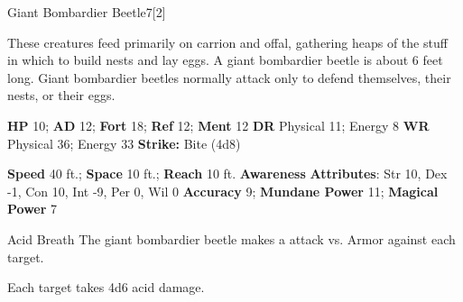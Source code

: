   \begin{monsection}{Giant Bombardier Beetle}{7}[2]
    \vspace{-1em}\vspace{-1em}
    \vspace{0em}

    
      These creatures feed primarily on carrion and offal, gathering heaps of the stuff in which to build nests and lay eggs.
      A giant bombardier beetle is about 6 feet long. Giant bombardier beetles normally attack only to defend themselves, their nests, or their eggs.
    

    \begin{spellcontent}
      \begin{spelltargetinginfo}
        \pari \textbf{HP} 10;
          \textbf{AD} 12;
          \textbf{Fort} 18;
          \textbf{Ref} 12;
          \textbf{Ment} 12
        \pari \textbf{DR} Physical 11; Energy 8
        \pari \textbf{WR} Physical 36; Energy 33
        \pari \textbf{Strike:}
            Bite  (4d8)
      \end{spelltargetinginfo}
    \end{spellcontent}
    \begin{monsterfooter}
      \pari \textbf{Speed} 40 ft.;
        \textbf{Space} 10 ft.;
        \textbf{Reach} 10 ft.
      \pari \textbf{Awareness} 
      \pari \textbf{Attributes}:
        Str 10, Dex -1,
        Con 10, Int -9,
        Per 0, Wil 0
      \pari \textbf{Accuracy} 9;
        \textbf{Mundane Power} 11;
      \textbf{Magical Power} 7
    \end{monsterfooter}
  \end{monsection}
  \begin{freeability}{Acid Breath}
       The giant bombardier beetle makes a  attack
        vs. Armor against each target.
    
    \hit Each target takes 4d6 acid damage.
    \end{freeability}
  
